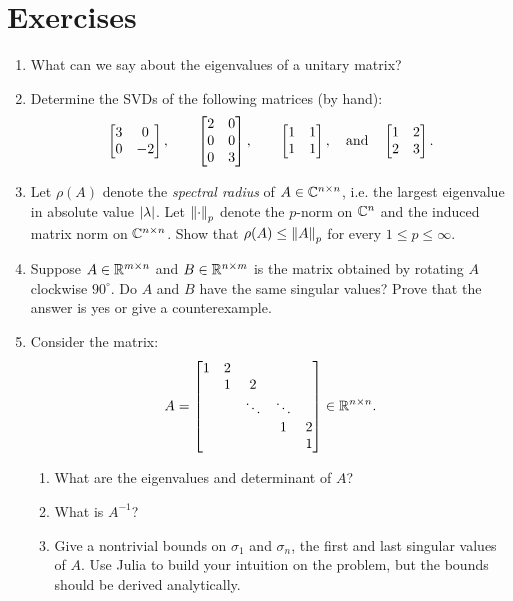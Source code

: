 \documentclass[11pt,letterpaper]{article}
\begin{document}
\section*{Exercises}

\begin{enumerate}

\item What can we say about the eigenvalues of a unitary matrix?

\item Determine the SVDs of the following matrices (by hand):
\[
\begin{bmatrix} 3 & 0\\ 0 & -2\end{bmatrix},\qquad \begin{bmatrix} 2 & 0\\ 0 & 0\\ 0 & 3\end{bmatrix},\qquad \begin{bmatrix} 1 & 1\\1 & 1\end{bmatrix},\quad{\rm and}\quad \begin{bmatrix} 1 & 2\\2 & 3\end{bmatrix}.
\]

\item Let $\rho(A)$ denote the {\em spectral radius} of $A\in\mathbb{C}^{n\times n}$, i.e. the largest eigenvalue in absolute value $\left|{\lambda}\right|$. Let $\left\|{\cdot}\right\|_p$ denote the $p$-norm on $\mathbb{C}^n$ and the induced matrix norm on $\mathbb{C}^{n\times n}$. Show that $\rho(A) \le \left\|{A}\right\|_p$ for every $1\le p\le\infty$.

\item Suppose $A\in\mathbb{R}^{m\times n}$ and $B\in\mathbb{R}^{n\times m}$ is the matrix obtained by rotating $A$ clockwise $90^{\circ}$. Do $A$ and $B$ have the same singular values? Prove that the answer is yes or give a counterexample.

\item Consider the matrix:
\[
A = \begin{bmatrix} 1 & 2\\ & 1 & 2\\ & & \ddots & \ddots\\ & & & 1 & 2\\ & & & & 1\end{bmatrix} \in \mathbb{R}^{n\times n}.
\]
\begin{enumerate}
\item What are the eigenvalues and determinant of $A$?
\item What is $A^{-1}$?
\item Give a nontrivial bounds on $\sigma_1$ and $\sigma_n$, the first and last singular values of $A$. Use {\sc Julia} to build your intuition on the problem, but the bounds should be derived analytically.
\end{enumerate}

\end{enumerate}
\end{document}
